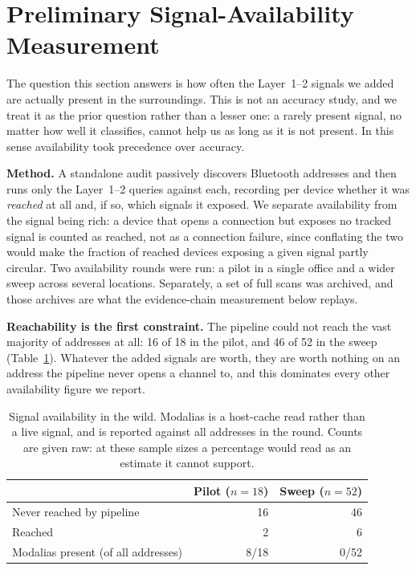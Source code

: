 \documentclass[conference]{IEEEtran}
\begin{document}
\section{Preliminary Signal-Availability Measurement}\label{sec:eval}
The question this section answers is how often the Layer~1--2 signals we added
are actually present in the surroundings. This is not an accuracy study, and
we treat it as the prior question rather than a lesser one: a rarely present
signal, no matter how well it classifies, cannot help us as long as it is not
present. In this sense availability took precedence over accuracy.

\textbf{Method.} A standalone audit passively discovers Bluetooth addresses
and then runs only the Layer~1--2 queries against each, recording per device
whether it was \emph{reached} at all and, if so, which signals it exposed. We
separate availability from the signal being rich: a device that opens a
connection but exposes no tracked signal is counted as reached, not as a
connection failure, since conflating the two would make the fraction of
reached devices exposing a given signal partly circular. Two availability
rounds were run: a pilot in a single office and a wider sweep across several
locations. Separately, a set of full scans was archived, and those archives
are what the evidence-chain measurement below replays.

\textbf{Reachability is the first constraint.} The pipeline could not reach
the vast majority of addresses at all: 16 of 18 in the pilot, and 46 of 52 in
the sweep (Table~\ref{tab:avail}). Whatever the added signals are worth, they
are worth nothing on an address the pipeline never opens a channel to, and
this dominates every other availability figure we report.

\begin{table}[t]
\centering
\footnotesize
\setlength{\tabcolsep}{4pt}
\renewcommand{\arraystretch}{1.2}
\caption{Signal availability in the wild. Modalias is a host-cache read rather
than a live signal, and is reported against all addresses in the round. Counts
are given raw: at these sample sizes a percentage would read as an estimate it
cannot support.}
\label{tab:avail}
\begin{tabular}{@{}>{\raggedright\arraybackslash}p{4.7cm} r r@{}}
\toprule
& \textbf{Pilot ($n{=}18$)} & \textbf{Sweep ($n{=}52$)} \\
\midrule
Never reached by pipeline & 16 & 46 \\
Reached & 2 & 6 \\
\midrule
Modalias present (of all addresses) & 8/18 & 0/52 \\
\bottomrule
\end{tabular}
\end{table}
\end{document}
